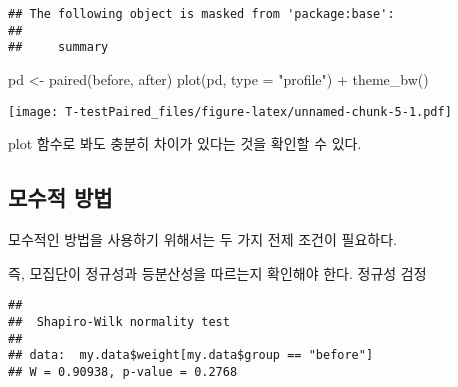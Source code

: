 \documentclass[
]{article}
\newenvironment{Shaded}{\begin{snugshade}}{\end{snugshade}}
\newcommand{\AttributeTok}[1]{\textcolor[rgb]{0.77,0.63,0.00}{#1}}
\newcommand{\FunctionTok}[1]{\textcolor[rgb]{0.00,0.00,0.00}{#1}}
\newcommand{\NormalTok}[1]{#1}
\newcommand{\OtherTok}[1]{\textcolor[rgb]{0.56,0.35,0.01}{#1}}
\newcommand{\SpecialCharTok}[1]{\textcolor[rgb]{0.00,0.00,0.00}{#1}}
\newcommand{\StringTok}[1]{\textcolor[rgb]{0.31,0.60,0.02}{#1}}
\begin{document}
\begin{verbatim}
## The following object is masked from 'package:base':
## 
##     summary
\end{verbatim}

\begin{Shaded}
\begin{Highlighting}[]
\NormalTok{pd }\OtherTok{\textless{}{-}} \FunctionTok{paired}\NormalTok{(before, after)}
\FunctionTok{plot}\NormalTok{(pd, }\AttributeTok{type =} \StringTok{"profile"}\NormalTok{) }\SpecialCharTok{+} \FunctionTok{theme\_bw}\NormalTok{()}
\end{Highlighting}
\end{Shaded}

\texttt{[image: T-testPaired\_files/figure-latex/unnamed-chunk-5-1.pdf]}

plot 함수로 봐도 충분히 차이가 있다는 것을 확인할 수 있다.

\hypertarget{uxbaa8uxc218uxc801-uxbc29uxbc95-1}{%
\subsection{모수적 방법}\label{uxbaa8uxc218uxc801-uxbc29uxbc95-1}}

모수적인 방법을 사용하기 위해서는 두 가지 전제 조건이 필요하다.

즉, 모집단이 정규성과 등분산성을 따르는지 확인해야 한다.
정규성 검정

\begin{Shaded}
\end{Shaded}

\begin{verbatim}
## 
##  Shapiro-Wilk normality test
## 
## data:  my.data$weight[my.data$group == "before"]
## W = 0.90938, p-value = 0.2768
\end{verbatim}

\begin{Shaded}
\end{Shaded}
\end{document}
